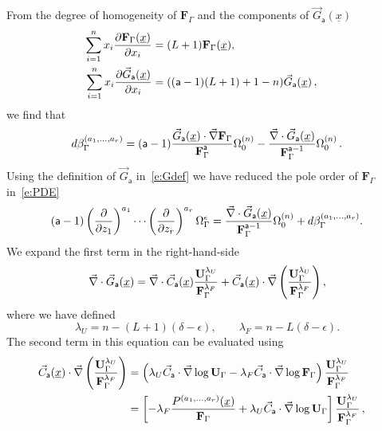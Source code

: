 \documentclass[a4paper,12pt]{article}
\numberwithin{equation}{section}
\numberwithin{figure}{section}
\begin{document}
From the degree of homogeneity of $\mathbf{F}_\Gamma$ and the
components of $\vec G_{\mathsf{a}}(\underline x)$ 
\begin{align}
  \sum_{i=1}^n x_i {\partial\mathbf{F}_\Gamma (\underline x)\over \partial x_i}&=
                                                                  (L+1) \mathbf{F}_\Gamma (\underline x),\cr
   \sum_{i=1}^n x_i {\partial\vec G_{\mathsf{a}}(\underline x)\over \partial x_i}&=
                                                                  ((\mathsf{a}-1)(L+1)+1-n) \vec G_{\mathsf{a}}(\underline x) \,,
\end{align}
we find that 
   \begin{equation}
     d\beta_\Gamma^{(a_1,\dots,a_r)}= (\mathsf{a}-1) {  \vec  G_{\mathsf{a}}
     (\underline x)
\cdot    \vec \nabla\textbf{F}_\Gamma\over
     \textbf{F}_\Gamma^{\mathsf{a}}}\Omega_0^{(n)}-{
\vec\nabla \cdot \vec G_{\mathsf{a}}
     (\underline x)
    \over
   \textbf{F}_\Gamma^{\mathsf{a}-1}}
  \Omega_0^{(n)} \,.
\end{equation}
Using the definition of $\vec  G_{\mathsf{a}}$ in~\eqref{e:Gdef} we
have reduced the pole order  of $ \textbf{F}_\Gamma$ in~\eqref{e:PDE} 
\begin{equation}\label{e:RedG1}
 (\mathsf{a}-1)\left(\partial\over \partial z_1\right)^{a_1}\cdots\left(\partial
  \over\partial z_r\right)^{a_r} \Omega_\Gamma^\epsilon={
\vec\nabla \cdot \vec G_{\mathsf{a}}
     (\underline x)
    \over
  \textbf{F}_\Gamma^{\mathsf{a}-1}}
  \Omega_0^{(n)}+d\beta_\Gamma^{(a_1,\dots,a_r)}.
\end{equation}
%
We expand the first term in the right-hand-side
\begin{equation}
  \vec\nabla \cdot \vec G_{\mathsf{a}}(\underline x)=  \vec\nabla \cdot \vec C_{\mathsf{a}}(\underline x) {\textbf{U}_\Gamma^{\lambda_U}\over
  \textbf{F}_\Gamma^{\lambda_F}} 
+
  \vec C_{\mathsf{a}}(\underline x) \cdot\vec\nabla  \left(   {\textbf{U}_\Gamma^{\lambda_U}\over
  \textbf{F}_\Gamma^{\lambda_F}} \right),
\end{equation}
where we have defined
\begin{equation}\label{e:powerUFDef}
  \lambda_U=n-(L+1)(\delta-\epsilon), \qquad 
  \lambda_F=n-L(\delta-\epsilon).
  \end{equation}
%
The second term in this equation can be evaluated using 
\begin{align}
  \vec C_{\mathsf{a}}(\underline x)\cdot \vec\nabla \left(\mathbf{U}_\Gamma^{\lambda_U}\over
\mathbf{F}_\Gamma^{\lambda_F}\right)&=\left(\lambda_U \vec
C_{\mathsf{a}}\cdot \vec\nabla \log\mathbf{U}_\Gamma -{\lambda_F} \vec
C_{\mathsf{a}}\cdot \vec\nabla \log \mathbf{F}_\Gamma\right) {\mathbf{U}_\Gamma^{\lambda_U}\over
\mathbf{F}_\Gamma^{\lambda_F}} \cr
&=\left[-{\lambda_F}{
    P^{(a_1,\dots,a_r)}(\underline x)\over
  \mathbf{F}_\Gamma}   
+
 \lambda_U \vec
C_{\mathsf{a}}\cdot \vec\nabla \log\mathbf{U}_\Gamma \right] {\mathbf{U}_\Gamma^{\lambda_U}\over
	\mathbf{F}_\Gamma^{\lambda_F}}\,,
\end{align}
\end{document}
